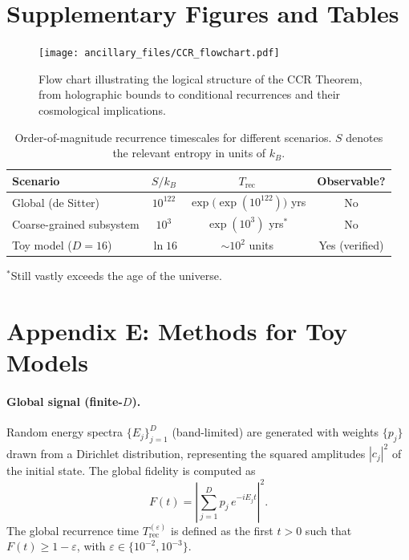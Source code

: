 \documentclass[12pt]{article}
\newcommand{\Trec}{T_{\text{rec}}}
\theoremstyle{remark}
\begin{document}
\nocite{*}

\appendix
\section{Supplementary Figures and Tables}

\begin{figure}[H]
    \centering
\texttt{[image: ancillary\_files/CCR\_flowchart.pdf]}
    \caption{Flow chart illustrating the logical structure of the CCR Theorem, from holographic bounds to conditional recurrences and their cosmological implications.}
    \label{fig:CCR_flowchart}
\end{figure}

\begin{table}[H]
\centering
\caption{Order-of-magnitude recurrence timescales for different scenarios. 
$S$ denotes the relevant entropy in units of $k_B$.}
\vspace{0.2cm}
\begin{tabular}{lccc}
\hline
\textbf{Scenario} & \textbf{$S/k_B$} & \textbf{$\Trec$} & \textbf{Observable?} \\
\hline
Global (de Sitter) & $10^{122}$ & $\exp\!\big(\exp(10^{122})\big)$ yrs & No \\
Coarse-grained subsystem & $10^{3}$ & $\exp(10^{3})$ yrs$^{\ast}$ & No \\
Toy model ($D=16$) & $\ln 16$ & $\sim 10^{2}$ units & Yes (verified) \\
\hline
\end{tabular}
\label{tab:timescales}
\end{table}
\vspace{-0.3cm}
{\footnotesize $^{\ast}$Still vastly exceeds the age of the universe.}

\section*{Appendix E: Methods for Toy Models}
\label{app:methods-toys}

\paragraph{Global signal (finite-$D$).}
Random energy spectra $\{E_j\}_{j=1}^D$ (band-limited) are generated with weights $\{p_j\}$ drawn from a Dirichlet distribution, representing the squared amplitudes $|c_j|^2$ of the initial state.
The global fidelity is computed as
\[
F(t) = \left| \sum_{j=1}^D p_j \, e^{-i E_j t} \right|^2 .
\]
The global recurrence time $\Trec^{(\varepsilon)}$ is defined as the first $t>0$ such that $F(t) \geq 1-\varepsilon$, with $\varepsilon \in \{10^{-2}, 10^{-3}\}$.
\end{document}
